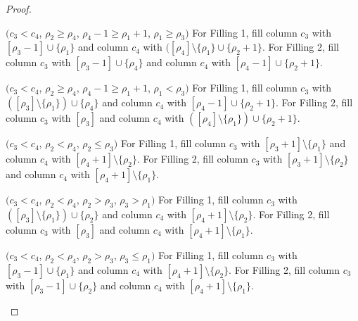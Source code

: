 \begin{proof}
\begin{Case}
{ $(c_3 < c_4$, $\rho_2\geq \rho_4$, $\rho_4-1 \geq \rho_1+1$, $\rho_1\geq \rho_3)$} 
For Filling 1, fill column $c_3$ with $[\rho_3-1]\cup \{\rho_1\}$ and column $c_4$ with $([\rho_4]\setminus\{\rho_1\}\cup \{\rho_2+1\}$. For Filling 2, fill column $c_3$ with $[\rho_3-1]\cup \{\rho_4\}$ and column $c_4$ with $[\rho_4-1]\cup \{\rho_2+1\}$.
\end{Case}

\begin{Case}
{ $(c_3 < c_4$, $\rho_2\geq \rho_4$, $\rho_4-1 \geq \rho_1+1$, $\rho_1< \rho_3)$} 
For Filling 1, fill column $c_3$ with $([\rho_3]\setminus \{\rho_1\})\cup \{\rho_4\}$ and column $c_4$ with $[\rho_4-1]\cup \{\rho_2+1\}$.
For Filling 2, fill column $c_3$ with $[\rho_3]$ and column $c_4$ with $([\rho_4]\setminus\{\rho_1\})\cup \{\rho_2+1\}$.
\end{Case}

\begin{Case}
{ $(c_3 < c_4$, $\rho_2< \rho_4$, $\rho_2 \leq \rho_3)$} 
For Filling 1, fill column $c_3$ with $[\rho_3+1]\setminus \{\rho_1\}$ and column $c_4$ with $[\rho_4+1]\setminus \{\rho_2\}$. For Filling 2, fill column $c_3$ with $[\rho_3+1]\setminus \{\rho_2\}$ and column $c_4$ with $[\rho_4+1]\setminus \{\rho_1\}$.
\end{Case}

\begin{Case}
{ $(c_3 < c_4$, $\rho_2< \rho_4$, $\rho_2 > \rho_3$, $\rho_3>\rho_1)$} 
For Filling 1, fill column $c_3$ with $([\rho_3]\setminus \{\rho_1\})\cup \{\rho_2\}$ and column $c_4$ with $[\rho_4+1]\setminus \{\rho_2\}$. For Filling 2, fill column $c_3$ with $[\rho_3]$ and column $c_4$ with $[\rho_4+1]\setminus \{\rho_1\}$.
\end{Case}

\begin{Case}
{ $(c_3 < c_4$, $\rho_2< \rho_4$, $\rho_2 > \rho_3$, $\rho_3\leq\rho_1)$} 
For Filling 1, fill column $c_3$ with $[\rho_3-1]\cup \{\rho_1\}$ and column $c_4$ with $[\rho_4+1]\setminus \{\rho_2\}$. For Filling 2, fill column $c_3$ with $[\rho_3-1]\cup \{\rho_2\}$ and column $c_4$ with $[\rho_4+1]\setminus \{\rho_1\}$.
\end{Case}


\end{proof}
